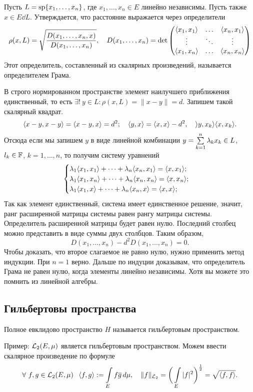 \begin{The}
  Пусть $L = \operatorname{sp}\{x_1,\dots,x_n\}$, где $x_1,\dots,x_n\in E$ линейно независимы. Пусть также $x\in E\dd L$. Утверждается, что расстояние выражается через определители
\[
  \rho(x,L) = \sqrt{\frac{D(x_1,\dots,x_n,x)}{D(x_1,\dots,x_n)}},\quad
  D(x_1,\dots,x_n) = \det\begin{pmatrix}
   \langle x_1,x_1\rangle &\dots & \langle x_n,x_1\rangle\\
   \vdots & \ddots & \vdots\\
   \langle x_1,x_n\rangle &\dots & \langle x_n,x_n\rangle
\end{pmatrix}
\]
Этот определитель, составленный из скалярных произведений, называется определителем Грама.
\end{The}

\begin{Proof}
  В строго нормированном пространстве элемент наилучшего приближения единственный, то есть $\exists!\ y\in L\colon\rho(x,L) = \|x-y\|=d$. Запишем такой скалярный квадрат.
\[
  \langle x-y,x-y\rangle = \langle x-y,x\rangle = d^2;\quad \langle y,x\rangle = \langle x,x\rangle - d^2,\quad \rangle y,x_k\rangle \langle x,x_k\rangle.
\]
Отсюда если мы запишем $y$ в виде линейной комбинации $y = \sum\limits_{k = 1}^{n}\lambda_kx_k\in L$, $l_k\in\mathbb F$, $k=1,\dots,n$, то получим систему уравнений
\[
\begin{cases}
\l_1\la x_1,x_1\ra +\dots + \l_n\la x_n,x_1\ra = \la x,x_1\ra;\\
\dotfill
\l_1\la x_1,x_n\ra +\dots + \l_n\la x_n,x_n\ra = \la x,x_n\ra;\\
\l_1\la x_1,x\ra +\dots + \l_n\la x_n,x\ra = \la x,x\ra;\\
\end{cases}
\]
Так как элемент единственный, система имеет единственное решение, значит, ранг расширенной матрицы системы равен рангу матрицы системы. Определитель расширенной матрицы будет равен нулю. Последний столбец можно представить в виде суммы двух столбцов. Таким образом,
\[
  D(x_1,\dots,x_n)- d^2D(x_1,\dots,x_n) = 0.
\]
Чтобы доказать, что второе слагаемое не равно нулю, нужно применить метод индукции. При $n=1$ верно. Дальше по индуции доказывам, что определитель Грама не равен нулю, когда элементы линейно независимы. Хотя вы можете это помнить из линейной алгебры.
\end{Proof}

\subsection{Гильбертовы пространства}
\begin{Def}
  Полное евклидово пространство $H$ называется гильбертовым пространством.
\end{Def}
Пример: $\mathcal L_2(E,\mu)$ является гильбертовым пространством. Можем ввести скалярное произведение по формуле
\[
  \forall\ f,g\in \mathcal L_2(E,\mu)\hskip .75em plus.1em minus.08em\relax \langle f,g\rangle :=\int\limits_{E}f\overline{g}\,d\mu,\quad
                                     \|f\|_{\mathcal L_2} = \bigg(\int\limits_{E}{|f|^2}\bigg)^{\frac12} = \sqrt{\langle f,f\rangle}.
\]

